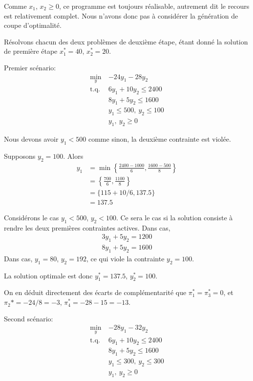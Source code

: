 \documentclass[12pt]{book}
\begin{document}
\begin{enumerate}
Comme $x_1$, $x_2 \geq 0$, ce programme est toujours réalisable, autrement dit le recours est relativement complet.
Nous n'avons donc pas à considérer la génération de coupe d'optimalité.

Résolvons chacun des deux problèmes de deuxième étape, étant donné la solution de première étape $x_1^* = 40$, $x_2^* = 20$.

Premier scénario:
\begin{align*}
\min_y\ & -24y_1 -28y_2 \\
\mbox{t.q. }
& 6y_1 + 10y_2 \leq 2400 \\
& 8y_1 + 5y_2 \leq 1600 \\
& y_1 \leq 500,\ y_2 \leq 100 \\
& y_1,\ y_2 \geq 0
\end{align*}

Nous devons avoir $y_1 < 500$ comme sinon, la deuxième contrainte est violée.

Supposons $y_2 = 100$. Alors
\begin{align*}
y_1 &= \min \left\{ \frac{2400-1000}{6}, \frac{1600-500}{8} \right\} \\
&= \left\{ \frac{700}{6}, \frac{1100}{8} \right\} \\
&= \{ 115+10/6, 137.5 \} \\
&=  137.5
\end{align*}

Considérons le cas $y_1 < 500$, $y_2 < 100$. Ce sera le cas si la solution consiste à rendre les deux premières contraintes actives. Dans cas,
\begin{align*}
3y_1 + 5y_2 = 1200 \\
8y_1 + 5y_2 = 1600
\end{align*}
Dans cas, $y_1 = 80$, $y_2 = 192$, ce qui viole la contrainte $y_2 = 100$.

La solution optimale est donc $y_1^* = 137.5$, $y_2^* = 100$.

On en déduit directement des écarts de complémentarité que $\pi_1^* = \pi_3^* = 0$, et $\pi_2* = -24/8 = -3$, $\pi_4^* = -28-15=-13$.

Second scénario:
\begin{align*}
\min_y\ & -28y_1 -32y_2 \\
\mbox{t.q. }
& 6y_1 + 10y_2 \leq 2400 \\
& 8y_1 + 5y_2 \leq 1600 \\
& y_1 \leq 300,\ y_2 \leq 300 \\
& y_1,\ y_2 \geq 0
\end{align*}


\end{enumerate}
\end{document}
